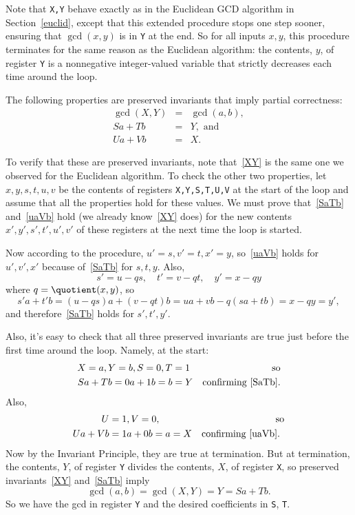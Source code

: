 \begin{editingnotes}
Note that \texttt{X,Y} behave exactly as in the Euclidean GCD algorithm in
Section~\ref{euclid}, except that this extended procedure stops one step
sooner, ensuring that $\gcd(x,y)$ is in \texttt{Y} at the end.  So for all
inputs $x,y$, this procedure terminates for the same reason as the
Euclidean algorithm: the contents, $y$, of register \texttt{Y} is a
nonnegative integer-valued variable that strictly decreases each time
around the loop.

The following properties are preserved invariants that imply partial
correctness:
\begin{eqnarray}
\gcd(X,Y) &=& \gcd(a,b), \label{XY}\\
Sa+Tb &=& Y,\text{ and }\label{SaTb}\\
Ua+Vb &=& X. \label{uaVb}
\end{eqnarray}

To verify that these are preserved invariants, note that~\eqref{XY} is the
same one we observed for the Euclidean algorithm.  To check the other two
properties, let $x,y,s,t,u,v$ be the contents of registers
\texttt{X,Y,S,T,U,V} at the start of the loop and assume that all the
properties hold for these values.  We must prove that~\eqref{SaTb}
and~\eqref{uaVb} hold (we already know~\eqref{XY} does) for the new
contents $x',y',s',t',u',v'$ of these registers at the next time the loop
is started.

Now according to the procedure, $u'=s,v'=t,x'=y$, so~\eqref{uaVb} holds
for $u',v',x'$ because of~\eqref{SaTb} for $s,t,y$.  Also, 
\[
s'= u - qs,\quad t'= v - qt,\quad y' = x - qy
\]
where $q = \quotient(x,y)$,
so
\[
s'a+t'b = (u-qs)a + (v-qt)b =ua+vb - q(sa+tb) = x - qy = y',
\]
and therefore~\eqref{SaTb} holds for $s',t',y'$.

Also, it's easy to check that all three preserved invariants are true just
before the first time around the loop.  Namely, at the start:
\begin{align*}
X      =a, Y=b,S=0, T& =1 & \mbox{so}\\
Sa+Tb = 0a+1b=b& =Y & \mbox{confirming~\eqref{SaTb}.}
\end{align*}
Also,
\begin{align*}
U     & =1, V=0, & \mbox{so} \\
Ua+Vb & = 1a+0b=a =X & \mbox{confirming~\eqref{uaVb}.  }
\end{align*}
Now by the Invariant Principle, they are true at termination.  But at
termination, the contents, $Y$, of register \texttt{Y} divides the
contents, $X$, of register \texttt{X}, so preserved invariants~\eqref{XY}
and~\eqref{SaTb} imply
\[
\gcd(a,b) = \gcd(X,Y) = Y = Sa + Tb.
\]
So we have the gcd in register \texttt{Y} and the desired coefficients in
\texttt{S}, \texttt{T}.


\end{editingnotes}
